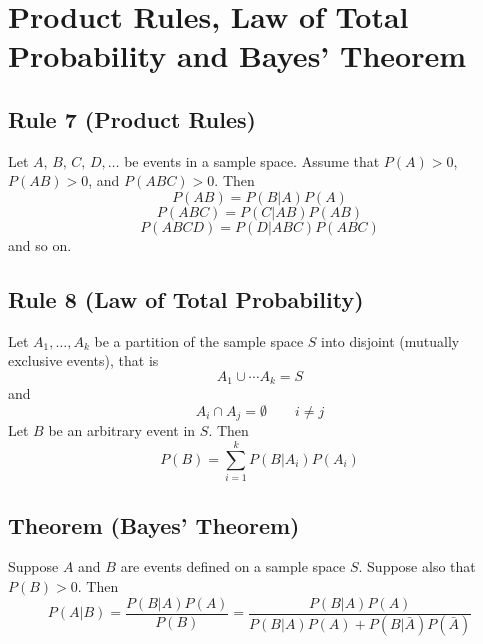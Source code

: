 \section{Product Rules, Law of Total Probability and Bayes' Theorem}

\begin{thmbox}
    \subsection{Rule 7 (Product Rules)}
    Let $ A,\,B,\,C,\,D,\ldots  $ be events in a sample space. Assume
    that $ P(A)>0 $, $ P(AB)>0 $, and $ P(ABC)>0 $. Then
    \[ P(AB)=P(B|A)P(A) \]
    \[ P(ABC)=P(C|AB)P(AB) \]
    \[ P(ABCD)=P(D|ABC)P(ABC) \]
    and so on.
\end{thmbox}

\begin{thmbox}
    \subsection{Rule 8 (Law of Total Probability)}
    Let $ A_1,\ldots ,A_k $ be a partition of the sample space $ S $
    into disjoint (mutually exclusive events), that is
    \[ A_1\cup\cdots A_k=S \]
    and
    \[ A_i\cap A_j=\emptyset\qquad i\neq j \]
    Let $ B $ be an arbitrary event in $ S $. Then
    \[ P(B)=\sum\limits_{i=1}^{k} P(B|A_i)P(A_i) \]
\end{thmbox}

\begin{thmbox}
    \subsection{Theorem (Bayes' Theorem)}
    Suppose $ A $ and $ B $ are events defined on a sample space $ S $. Suppose
    also that $ P(B)>0 $. Then
    \[ P(A|B)=\frac{P(B|A)P(A)}{P(B)}=\frac{P(B|A)P(A)}{P(B|A)P(A)+
            P(B|\bar{A})P(\bar{A})}  \]

\end{thmbox}
